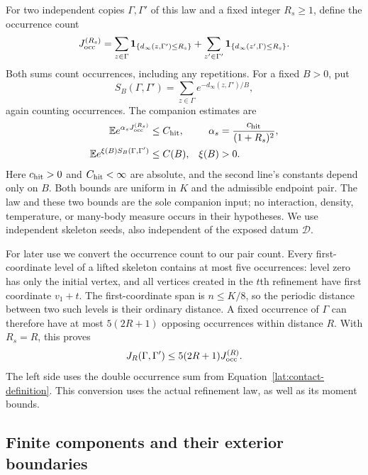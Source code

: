For two independent copies $\Gamma,\Gamma'$ of this law and a fixed integer
$R_s\ge1$, define the occurrence count
\begin{equation}\label{lat:occurrence-count}
 J_{\rm occ}^{(R_s)}=
 \sum_{z\in\Gamma}\mathbf 1_{\{d_\infty(z,\Gamma')\le R_s\}}
 +\sum_{z'\in\Gamma'}\mathbf 1_{\{d_\infty(z',\Gamma)\le R_s\}}.
\end{equation}
Both sums count occurrences, including any repetitions. For a fixed $B>0$,
put
\[
 S_B(\Gamma,\Gamma')=
       \sum_{z\in\Gamma}e^{-d_\infty(z,\Gamma')/B},
\]
again counting occurrences. The companion estimates are
\begin{align}
 \mathbb E e^{\alpha_s J_{\rm occ}^{(R_s)}}&\le C_{\rm hit},
 &\alpha_s&=\frac{c_{\rm hit}}{(1+R_s)^2},
       \label{lat:imported-hit}\\
 \mathbb E e^{\xi(B)S_B(\Gamma,\Gamma')}&\le C(B),
 &\xi(B)&>0.\label{lat:imported-soft}
\end{align}
Here $c_{\rm hit}>0$ and $C_{\rm hit}<\infty$ are absolute, and the second
line's constants depend only on $B$. Both bounds are uniform in $K$ and
the admissible endpoint pair. The law and these two bounds are the sole
companion input; no interaction, density, temperature, or many-body measure
occurs in their hypotheses. We use independent skeleton seeds, also
independent of the exposed datum $\mathcal D$.

For later use we convert the occurrence count to our pair count. Every
first-coordinate level of a lifted skeleton contains at most five
occurrences: level zero has only the initial vertex, and all vertices
created in the $t$th refinement have first coordinate $v_1+t$.
The first-coordinate span is $n\le K/8$, so the periodic distance between
two such levels is their ordinary distance. A fixed occurrence of $\Gamma$
can therefore have at most $5(2R+1)$ opposing occurrences within distance
$R$. With $R_s=R$, this proves
\begin{equation}\label{lat:pair-occurrence}
 J_R(\Gamma,\Gamma')\le 5(2R+1)J_{\rm occ}^{(R)}.
\end{equation}
The left side uses the double occurrence sum from
Equation~\eqref{lat:contact-definition}. This conversion uses the actual
refinement law, as well as its moment bounds.

\subsection{Finite components and their exterior boundaries}

